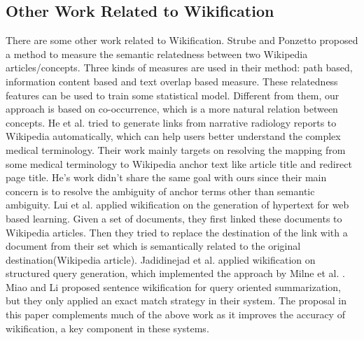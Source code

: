 \subsection{Other Work Related to Wikification}
There are some other work related to Wikification.
Strube and Ponzetto \cite{StrubeP06} proposed a method to measure
the semantic relatedness between two Wikipedia articles/concepts.
Three kinds of measures are used in their method: path based,
information content based and text overlap based measure.
These relatedness features can be used to train some
statistical model\cite{kulkarni2009collective,RatinovRDA11}.
Different from them, our approach is based on co-occurrence,
which is a more natural relation between concepts.
He et al. \cite{HeRSOQ11} tried to
generate links from narrative radiology reports to Wikipedia automatically,
which can help users better understand the complex medical terminology.
Their work mainly targets on resolving the mapping from some medical terminology
to Wikipedia anchor text like article title and redirect page title.
He's work didn't share the same goal with ours since their main concern is
to resolve the ambiguity of anchor terms other than semantic ambiguity.
Lui et al. \cite{lui2011generation} applied wikification on
the generation of hypertext for web based learning.
Given a set of documents,
they first linked these documents to Wikipedia articles.
Then they tried to replace the destination of the link with
a document from their set which is semantically
related to the original destination(Wikipedia article).
Jadidinejad et al. \cite{jadidinejad2009query} applied wikification
on structured query generation, which implemented the approach by
Milne et al. \cite{milne2008learning}.
Miao and Li proposed sentence wikification for query
oriented summarization, but they only applied an exact match strategy in
their system. The proposal in this paper complements much of the above
work as it improves the accuracy of wikification, a key component in
these systems.




